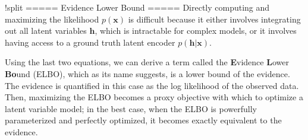!split
===== Evidence Lower Bound =====
Directly computing and maximizing the likelihood $p(\bm{x})$ is
difficult because it either involves integrating out all latent
variables $\bm{h}$, which is intractable for
complex models, or it involves having access to a ground truth latent
encoder $p(\bm{h}|\bm{x})$.

Using the last  two equations, we can derive a term called the \textbf{E}vidence
\textbf{L}ower \textbf{Bo}und (ELBO), which as its name suggests, is a lower
  bound of the evidence.  The evidence is quantified in this case as
the log likelihood of the observed data.  Then, maximizing the ELBO
becomes a proxy objective with which to optimize a latent variable
model; in the best case, when the ELBO is powerfully parameterized and
perfectly optimized, it becomes exactly equivalent to the evidence.



